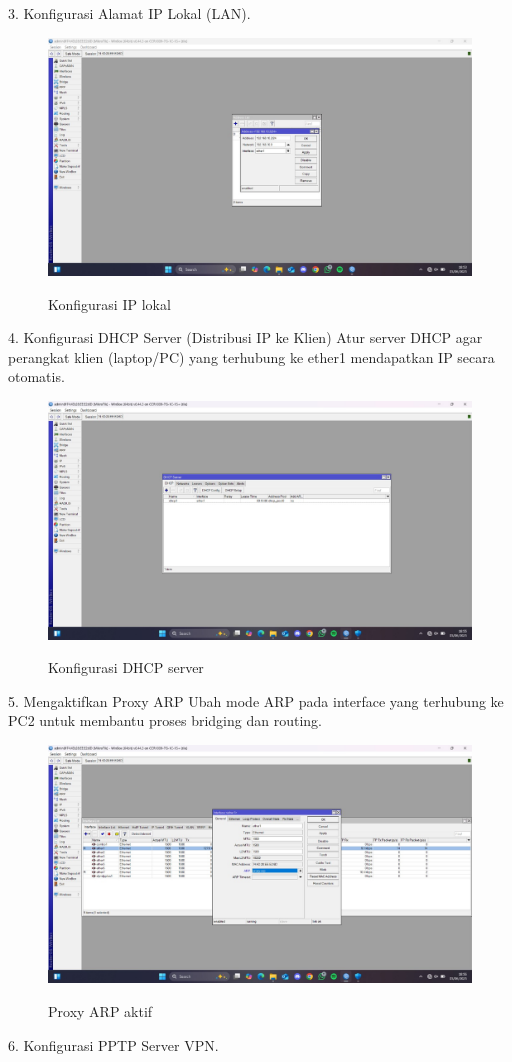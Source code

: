 3. Konfigurasi Alamat IP Lokal (LAN).
\begin{figure}[H]
    \centering
    \includegraphics[width=0.65\linewidth]{image/tun7.jpg}
    \label{fig:inirujukan}
    \caption{Konfigurasi IP lokal}
\end{figure}
4. Konfigurasi DHCP Server (Distribusi IP ke Klien) Atur server DHCP agar perangkat klien (laptop/PC) yang terhubung ke ether1 mendapatkan IP secara otomatis.
\begin{figure}[H]
    \centering
    \includegraphics[width=0.65\linewidth]{image/tun8.jpg}
    \label{fig:inirujukan}
    \caption{Konfigurasi DHCP server}
\end{figure}
5. Mengaktifkan Proxy ARP Ubah mode ARP pada interface yang terhubung ke PC2 untuk membantu proses bridging dan routing.
\begin{figure}[H]
    \centering
    \includegraphics[width=0.65\linewidth]{image/tun9.jpg}
    \label{fig:inirujukan}
    \caption{Proxy ARP aktif}
\end{figure}
6. Konfigurasi PPTP Server VPN. \\ 
